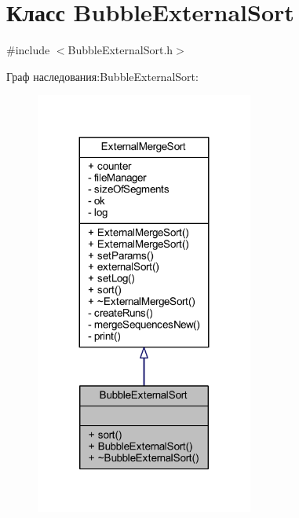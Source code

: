 \hypertarget{class_bubble_external_sort}{}\section{Класс Bubble\+External\+Sort}
\label{class_bubble_external_sort}


{\ttfamily \#include $<$Bubble\+External\+Sort.\+h$>$}



Граф наследования\+:Bubble\+External\+Sort\+:\nopagebreak
\begin{figure}[H]
\begin{center}
\leavevmode
\includegraphics[width=203pt]{class_bubble_external_sort__inherit__graph}
\end{center}
\end{figure}


